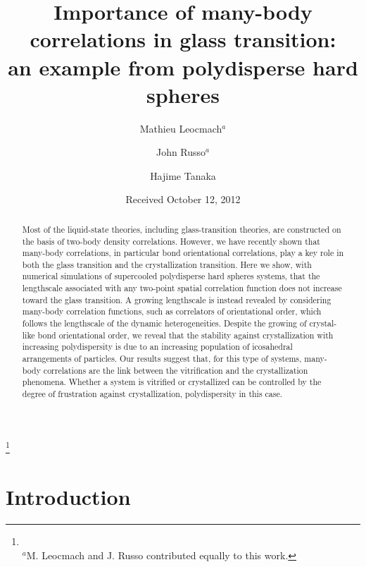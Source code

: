 \documentclass[twocolumn,superscriptaddress]{revtex4}
\begin{document}
\title{Importance of many-body correlations in glass transition:\\an example from polydisperse hard spheres} 

\author{Mathieu Leocmach$^a$}
\author{John Russo$^a$}
\thanks{\\$^a$M. Leocmach and J. Russo contributed equally to this work.}
\author{Hajime Tanaka}
\date{Received October 12, 2012}

\begin{abstract}
Most of the liquid-state theories, including glass-transition theories, are constructed on the basis of two-body density correlations. 
However, we have recently shown that many-body correlations, in particular bond orientational correlations, play a key role in
both the glass transition and the crystallization transition.
Here we show, with numerical simulations of supercooled polydisperse hard spheres systems, that the lengthscale associated with any two-point spatial 
correlation function does not increase toward the glass transition. A growing lengthscale is instead revealed
by considering many-body correlation functions, such as correlators of orientational order,
which follows the lengthscale of the dynamic heterogeneities.
Despite the growing of crystal-like bond orientational order, we reveal that the stability against crystallization with increasing polydispersity
is due to an increasing population of icosahedral arrangements of particles. 
Our results suggest that, for this type of systems, many-body correlations are the link between the vitrification and the crystallization phenomena.
Whether a system is vitrified or crystallized can be controlled by the degree of frustration against crystallization, polydispersity 
in this case.  
\end{abstract}

\maketitle

\section{Introduction}
\end{document}

